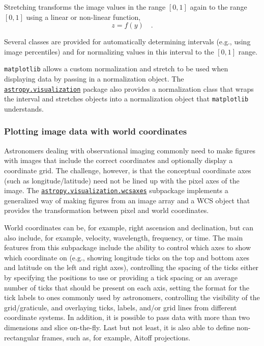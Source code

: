 \documentclass[modern]{aastex62}
\newcommand{\package}[1]{\texttt{#1}\xspace}
\newcommand{\astropysubpkg}[1]{\href{http://docs.astropy.org/en/stable/#1/index.html}{\texttt{astropy.#1}}\xspace}
\newcommand{\astropywcsaxes}{\href{http://docs.astropy.org/en/stable/visualization/wcsaxes/index.html}{\texttt{astropy.visualization.wcsaxes}}\xspace}
\begin{document}
Stretching transforms the image values in the range $[0,1]$ again to the range
$[0,1]$ using a linear or non-linear function,
\begin{equation}
z = f(y) \quad .
\end{equation}

Several classes are provided for automatically determining intervals
(e.g., using image percentiles) and for normalizing values in this interval to
the $[0,1]$ range.

\package{matplotlib} allows a custom normalization and stretch to be used when
displaying data by passing in a normalization object.
The \astropysubpkg{visualization} package also provides a normalization class
that wraps the interval and stretches objects into a normalization object that
\package{matplotlib} understands.

\subsubsection{Plotting image data with world coordinates}

Astronomers dealing with observational imaging commonly need to make figures
with images that include the correct coordinates and optionally display a
coordinate grid. The challenge, however, is that the conceptual coordinate axes
(such as longitude/latitude) need not be lined up with the pixel axes of the
image. The \astropywcsaxes subpackage implements a
generalized way of making figures from an image array and a WCS object
that provides the transformation between pixel and world coordinates.

World coordinates can be, for example, right ascension and declination, but can
also include, for example, velocity, wavelength, frequency, or time.
The main features from this subpackage include the ability to control which
axes to show which coordinate on (e.g., showing longitude ticks on the
top and bottom axes and latitude on the left and right axes), controlling the
spacing of the ticks either by specifying the positions to use or providing a
tick spacing or an average number of ticks that should be present on each axis,
setting the format for the tick labels to ones commonly used by astronomers,
controlling the visibility of the grid/graticule, and overlaying ticks, labels,
and/or grid lines from different coordinate systems. In addition, it is
possible to pass data with more than two dimensions and slice on-the-fly.
Last but not least, it is also able to define non-rectangular frames, such as,
for example, Aitoff projections.
\end{document}
